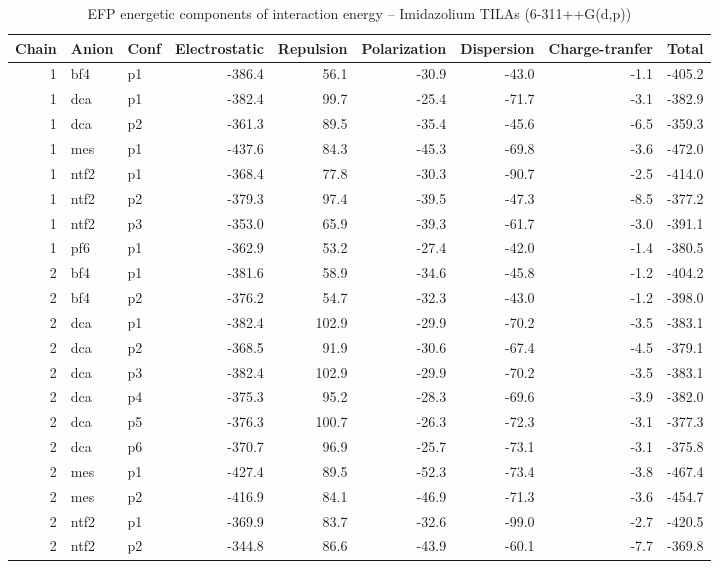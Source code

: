 \documentclass[a4paper]{article}
\begin{document}
\begin{table}[ht]
\centering
\footnotesize
\caption{EFP energetic components of interaction energy -- Imidazolium TILAs (6-311++G(d,p))}
\begin{tabular}{rllrrrrrr}
  \hline
Chain & Anion & Conf & Electrostatic & Repulsion & Polarization & Dispersion & Charge-tranfer & Total \\ 
  \hline
 1 & bf4 & p1 & -386.4 & 56.1 & -30.9 & -43.0 & -1.1 & -405.2 \\ 
   1 & dca & p1 & -382.4 & 99.7 & -25.4 & -71.7 & -3.1 & -382.9 \\ 
   1 & dca & p2 & -361.3 & 89.5 & -35.4 & -45.6 & -6.5 & -359.3 \\ 
   1 & mes & p1 & -437.6 & 84.3 & -45.3 & -69.8 & -3.6 & -472.0 \\ 
   1 & ntf2 & p1 & -368.4 & 77.8 & -30.3 & -90.7 & -2.5 & -414.0 \\ 
   1 & ntf2 & p2 & -379.3 & 97.4 & -39.5 & -47.3 & -8.5 & -377.2 \\ 
   1 & ntf2 & p3 & -353.0 & 65.9 & -39.3 & -61.7 & -3.0 & -391.1 \\ 
   1 & pf6 & p1 & -362.9 & 53.2 & -27.4 & -42.0 & -1.4 & -380.5 \\ 
   2 & bf4 & p1 & -381.6 & 58.9 & -34.6 & -45.8 & -1.2 & -404.2 \\ 
   2 & bf4 & p2 & -376.2 & 54.7 & -32.3 & -43.0 & -1.2 & -398.0 \\ 
   2 & dca & p1 & -382.4 & 102.9 & -29.9 & -70.2 & -3.5 & -383.1 \\ 
   2 & dca & p2 & -368.5 & 91.9 & -30.6 & -67.4 & -4.5 & -379.1 \\ 
   2 & dca & p3 & -382.4 & 102.9 & -29.9 & -70.2 & -3.5 & -383.1 \\ 
   2 & dca & p4 & -375.3 & 95.2 & -28.3 & -69.6 & -3.9 & -382.0 \\ 
   2 & dca & p5 & -376.3 & 100.7 & -26.3 & -72.3 & -3.1 & -377.3 \\ 
   2 & dca & p6 & -370.7 & 96.9 & -25.7 & -73.1 & -3.1 & -375.8 \\ 
   2 & mes & p1 & -427.4 & 89.5 & -52.3 & -73.4 & -3.8 & -467.4 \\ 
   2 & mes & p2 & -416.9 & 84.1 & -46.9 & -71.3 & -3.6 & -454.7 \\ 
   2 & ntf2 & p1 & -369.9 & 83.7 & -32.6 & -99.0 & -2.7 & -420.5 \\ 
   2 & ntf2 & p2 & -344.8 & 86.6 & -43.9 & -60.1 & -7.7 & -369.8 \\ 

\end{tabular}
\end{table}
\end{document}
